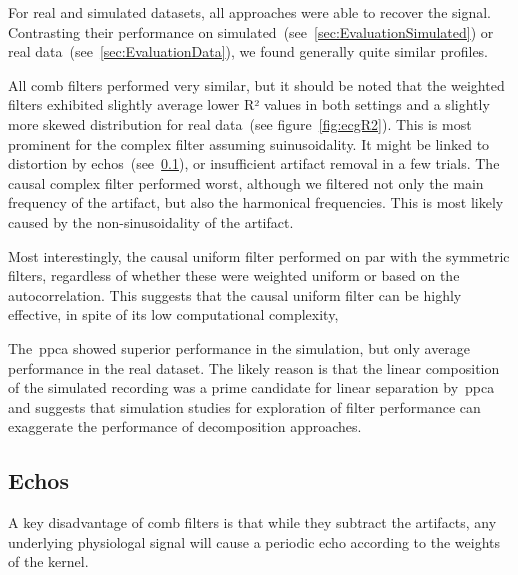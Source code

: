 \documentclass[a4paper]{article}
\newcommand{\figref}[1]{(see figure~\ref{#1})}
\newcommand{\secref}[1]{(see~\ref{#1})}
\begin{document}
For real and simulated datasets, all approaches were able to recover the signal. Contrasting their performance on simulated~\secref{sec:EvaluationSimulated} or real data~\secref{sec:EvaluationData}, we found generally quite similar profiles.

All comb filters performed very similar, but it should be noted that the weighted filters exhibited slightly average lower R² values in both settings and a slightly more skewed distribution for real data~\figref{fig:ecgR2}. This is most prominent for the complex filter assuming suinusoidality. It might be linked to distortion by echos~\secref{sec:discussEcho}, or insufficient artifact removal in a few trials.
The causal complex filter performed worst, although we filtered not only the main frequency of the artifact, but also the harmonical frequencies. This is most likely caused by the non-sinusoidality of the artifact.

Most interestingly, the causal uniform filter performed on par with the symmetric filters, regardless of whether these were weighted uniform or based on the autocorrelation. This suggests that the causal uniform filter can be highly effective, in spite of its low computational complexity,

The~\gls{ppca} showed superior performance in the simulation, but only average performance in the real dataset. The likely reason is that the linear composition of the simulated recording was a prime candidate for linear separation by~\gls{ppca} and suggests that simulation studies for exploration of filter performance can exaggerate the performance of decomposition approaches.

\subsection{Echos}\label{sec:discussEcho}
A key disadvantage of comb filters is that while they subtract the artifacts, any underlying physiologal signal will cause a periodic echo according to the weights of the kernel.
\end{document}
